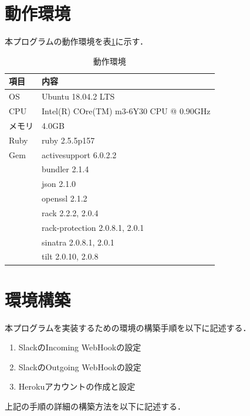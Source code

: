 \documentclass[12pt]{jsarticle}
\begin{document}
\section{動作環境}\label{sec:environment}
本プログラムの動作環境を表\ref{tab:2}に示す．
\begin{table}[h]
  \begin{center}
    \caption{動作環境}\label{tab:2}
    \begin{tabular}{l|l}
      \hline\hline
      \multicolumn{1}{l|}{項目} & \multicolumn{1}{l}{内容}\\
      \hline
      OS & Ubuntu 18.04.2 LTS\\
      CPU & Intel(R) COre(TM) m3-6Y30 CPU @ 0.90GHz\\
      メモリ & 4.0GB\\
      Ruby & ruby 2.5.5p157\\
      Gem & activesupport 6.0.2.2\\
     & bundler 2.1.4\\
     & json 2.1.0\\
     & openssl 2.1.2\\
     & rack 2.2.2, 2.0.4\\
     & rack-protection 2.0.8.1, 2.0.1\\
     & sinatra 2.0.8.1, 2.0.1\\
     & tilt 2.0.10, 2.0.8\\
      \hline
    \end{tabular}
  \end{center}
\end{table}


\section{環境構築}
本プログラムを実装するための環境の構築手順を以下に記述する．
\begin{enumerate}
\item SlackのIncoming WebHookの設定
\item SlackのOutgoing WebHookの設定
\item Herokuアカウントの作成と設定
\end{enumerate}
上記の手順の詳細の構築方法を以下に記述する．
\end{document}
